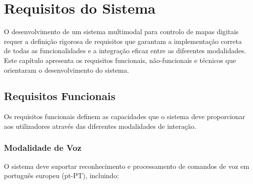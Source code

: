 
\chapter{Requisitos do Sistema}

O desenvolvimento de um sistema multimodal para controlo de mapas digitais requer a definição rigorosa de requisitos que garantam a implementação correta de todas as funcionalidades e a integração eficaz entre as diferentes modalidades. Este capítulo apresenta os requisitos funcionais, não-funcionais e técnicos que orientaram o desenvolvimento do sistema.

\section{Requisitos Funcionais}

Os requisitos funcionais definem as capacidades que o sistema deve proporcionar aos utilizadores através das diferentes modalidades de interação.

\subsection{Modalidade de Voz}

O sistema deve suportar reconhecimento e processamento de comandos de voz em português europeu (pt-PT), incluindo:

